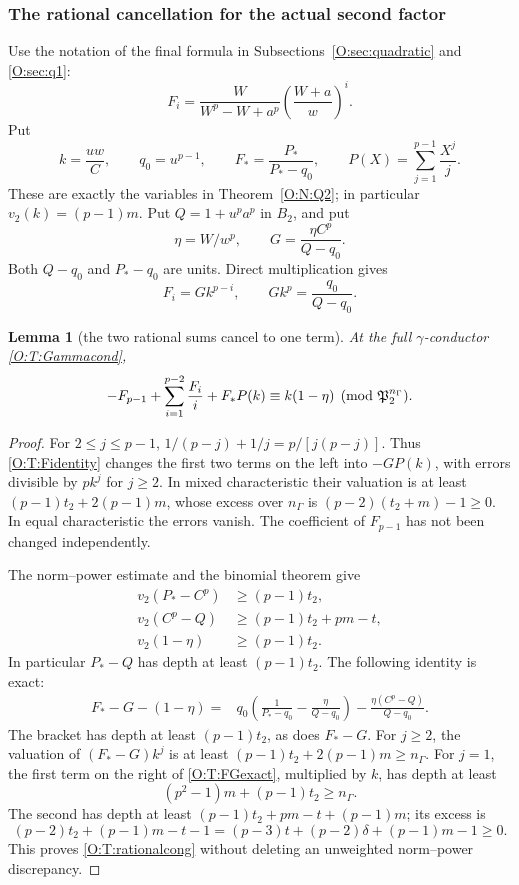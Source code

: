 \documentclass[11pt]{amsart}
\newtheorem{lemma}[theorem]{Lemma}
\theoremstyle{definition}
\theoremstyle{remark}
\begin{document}
\subsubsection*{The rational cancellation for the actual second factor}
Use the notation of the final formula in Subsections~\ref{O:sec:quadratic} and \ref{O:sec:q1}:
\[
 F_i=\frac{W}{W^p-W+a^p}\left(\frac{W+a}{w}\right)^i.
\]
Put
\[
 k=\frac{uw}{C},\qquad q_0=u^{p-1},\qquad
 F_*=\frac{P_*}{P_*-q_0},\qquad P(X)=\sum_{j=1}^{p-1}\frac{X^j}{j}.
\]
These are exactly the variables in Theorem~\ref{O:N:Q2}; in particular
$v_2(k)=(p-1)m$. Put $Q=1+u^pa^p$ in $B_2$, and put
\[
 \eta=W/w^p,\qquad G=\frac{\eta C^p}{Q-q_0}.
\]
Both $Q-q_0$ and $P_*-q_0$ are units. Direct multiplication gives
\begin{equation}\label{O:T:Fidentity}
 F_i=G k^{p-i},\qquad G k^p=\frac{q_0}{Q-q_0}.
\end{equation}
\begin{lemma}[the two rational sums cancel to one term]\label{O:T:rational}
At the full $\gamma$-conductor \eqref{O:T:Gammacond},
\begin{equation}\label{O:T:rationalcong}
 -F_{p-1}+\sum_{i=1}^{p-2}\frac{F_i}{i}+F_*P(k)
 \equiv k(1-\eta)\pmod{\mathfrak P_2^{n_\Gamma}}.
\end{equation}
\end{lemma}
\begin{proof}
For $2\le j\le p-1$,
$1/(p-j)+1/j=p/[j(p-j)]$.
Thus \eqref{O:T:Fidentity} changes the first two terms on the left into
$-GP(k)$, with errors divisible by $pk^j$ for $j\ge2$.
In mixed characteristic their valuation is at least
$(p-1)t_2+2(p-1)m$, whose excess over $n_\Gamma$ is
$(p-2)(t_2+m)-1\ge0$. In equal characteristic the errors vanish.
The coefficient of $F_{p-1}$ has not been changed independently.

The norm--power estimate and the binomial theorem give
\begin{align*}
 v_2(P_*-C^p)&\ge(p-1)t_2,\\
 v_2(C^p-Q)&\ge(p-1)t_2+pm-t,\\
 v_2(1-\eta)&\ge(p-1)t_2.
\end{align*}
In particular $P_*-Q$ has depth at least $(p-1)t_2$.
The following identity is exact:
\begin{align}\label{O:T:FGexact}
 F_*-G-(1-\eta)={}&q_0\left(
 \frac1{P_*-q_0}-\frac\eta{Q-q_0}\right)
 -\frac{\eta(C^p-Q)}{Q-q_0}.
\end{align}
The bracket has depth at least $(p-1)t_2$, as does $F_*-G$.
For $j\ge2$, the valuation of $(F_*-G)k^j$ is at least
$(p-1)t_2+2(p-1)m\ge n_\Gamma$.
For $j=1$, the first term on the right of \eqref{O:T:FGexact}, multiplied
by $k$, has depth at least
\[
 (p^2-1)m+(p-1)t_2\ge n_\Gamma.
\]
The second has depth at least
$(p-1)t_2+pm-t+(p-1)m$; its excess is
\[
 (p-2)t_2+(p-1)m-t-1
 =(p-3)t+(p-2)\delta+(p-1)m-1\ge0.
\]
This proves \eqref{O:T:rationalcong} without deleting an unweighted
norm--power discrepancy.
\end{proof}
\end{document}
